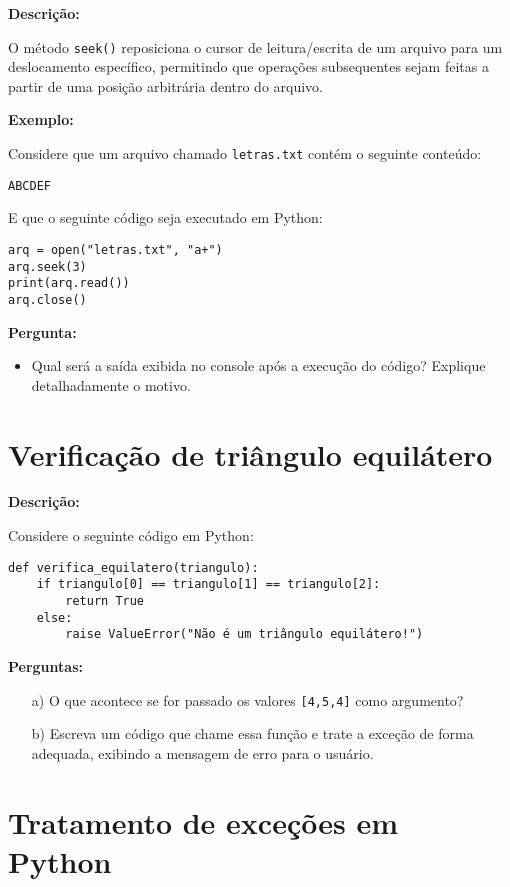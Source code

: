 \textbf{Descrição:}  

O método \texttt{seek()} reposiciona o cursor de leitura/escrita de um arquivo para um deslocamento específico, permitindo que operações subsequentes sejam feitas a partir de uma posição arbitrária dentro do arquivo.

\textbf{Exemplo:}

Considere que um arquivo chamado \texttt{letras.txt} contém o seguinte conteúdo:

\begin{verbatim}
ABCDEF
\end{verbatim}

E que o seguinte código seja executado em Python:

\begin{verbatim}
arq = open("letras.txt", "a+")
arq.seek(3)
print(arq.read())
arq.close()
\end{verbatim}

\textbf{Pergunta:}

\begin{itemize}
    \item Qual será a saída exibida no console após a execução do código? Explique detalhadamente o motivo.
\end{itemize}

\section{Verificação de triângulo equilátero}

\textbf{Descrição:}  

Considere o seguinte código em Python:

\begin{verbatim}
def verifica_equilatero(triangulo):
    if triangulo[0] == triangulo[1] == triangulo[2]:
        return True
    else:
        raise ValueError("Não é um triângulo equilátero!")
\end{verbatim}

\textbf{Perguntas:}

\begin{enumerate}
    \item[a)] O que acontece se for passado os valores \texttt{[4,5,4]} como argumento?
    \item[b)] Escreva um código que chame essa função e trate a exceção de forma adequada, exibindo a mensagem de erro para o usuário.
\end{enumerate}


\section{Tratamento de exceções em Python}

